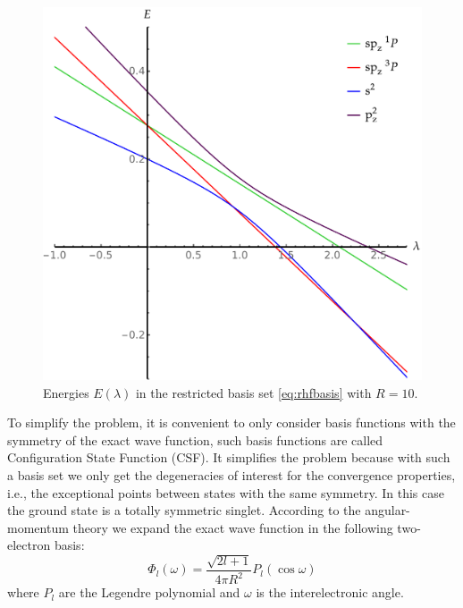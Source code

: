 \documentclass[11pt,a4paper]{article}
\begin{document}
\begin{figure}
    \centering
    \includegraphics[width=\linewidth]{EMP_RHF_R10.pdf}
    \caption{Energies $E(\lambda)$ in the restricted basis set \eqref{eq:rhfbasis} with $R=10$.}
    \label{fig:RHFMiniBas}
\end{figure}

To simplify the problem, it is convenient to only consider basis functions with the symmetry of the exact wave function, such basis functions are called Configuration State Function (CSF). It simplifies the problem because with such a basis set we only get the degeneracies of interest for the convergence properties, i.e., the exceptional points between states with the same symmetry. In this case the ground state is a totally symmetric singlet. According to the angular-momentum theory \cite{AngularBook, SlaterBook, Loos_2009} we expand the exact wave function in the following two-electron basis:
\begin{equation}
\Phi_l(\omega)=\frac{\sqrt{2l+1}}{4\pi R^2}P_l(\cos\omega)
\end{equation}
where $P_l$ are the Legendre polynomial and $\omega$ is the interelectronic angle.
\end{document}
